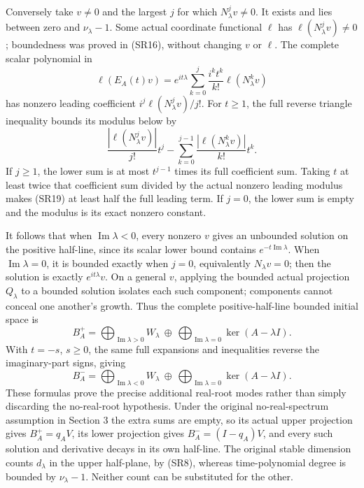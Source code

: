 \documentclass[
  11pt,
]{article}
\begin{document}
Conversely take \(v\ne0\) and the largest \(j\) for which
\(N_\lambda^jv\ne0\). It exists and lies between zero and
\(\nu_\lambda-1\). Some actual coordinate functional \(\ell\) has
\(\ell(N_\lambda^jv)\ne0\); boundedness was proved in (SR16), without
changing \(v\) or \(\ell\). The complete scalar polynomial in \[
 \ell(E_A(t)v)=e^{it\lambda}
       \sum_{k=0}^j\frac{i^kt^k}{k!}\ell(N_\lambda^kv)         \tag{SR18}
\] has nonzero leading coefficient \(i^j\ell(N_\lambda^jv)/j!\). For
\(t\geq1\), the full reverse triangle inequality bounds its modulus
below by \[
 \frac{|\ell(N_\lambda^jv)|}{j!}t^j
  -\sum_{k=0}^{j-1}\frac{|\ell(N_\lambda^kv)|}{k!}t^k.
                                                               \tag{SR19}
\] If \(j\geq1\), the lower sum is at most \(t^{j-1}\) times its full
coefficient sum. Taking \(t\) at least twice that coefficient sum
divided by the actual nonzero leading modulus makes (SR19) at least half
the full leading term. If \(j=0\), the lower sum is empty and the
modulus is its exact nonzero constant.

It follows that when \(\operatorname{Im}\lambda<0\), every nonzero \(v\)
gives an unbounded solution on the positive half-line, since its scalar
lower bound contains \(e^{-t\operatorname{Im}\lambda}\). When
\(\operatorname{Im}\lambda=0\), it is bounded exactly when \(j=0\),
equivalently \(N_\lambda v=0\); then the solution is exactly
\(e^{it\lambda}v\). On a general \(v\), applying the bounded actual
projection \(Q_\lambda\) to a bounded solution isolates each such
component; components cannot conceal one another's growth. Thus the
complete positive-half-line bounded initial space is \[
 B_A^+=\bigoplus_{\operatorname{Im}\lambda>0}W_\lambda
       \ \oplus\
       \bigoplus_{\operatorname{Im}\lambda=0}
                         \ker(A-\lambda I).                  \tag{SR20}
\] With \(t=-s\), \(s\geq0\), the same full expansions and inequalities
reverse the imaginary-part signs, giving \[
 B_A^-=\bigoplus_{\operatorname{Im}\lambda<0}W_\lambda
       \ \oplus\
       \bigoplus_{\operatorname{Im}\lambda=0}
                         \ker(A-\lambda I).                  \tag{SR21}
\] These formulas prove the precise additional real-root modes rather
than simply discarding the no-real-root hypothesis. Under the original
no-real-spectrum assumption in Section 3 the extra sums are empty, so
its actual upper projection gives \(B_A^+=q_AV\), its lower projection
gives \(B_A^-=(I-q_A)V\), and every such solution and derivative decays
in its own half-line. The original stable dimension counts \(d_\lambda\)
in the upper half-plane, by (SR8), whereas time-polynomial degree is
bounded by \(\nu_\lambda-1\). Neither count can be substituted for the
other.
\end{document}

